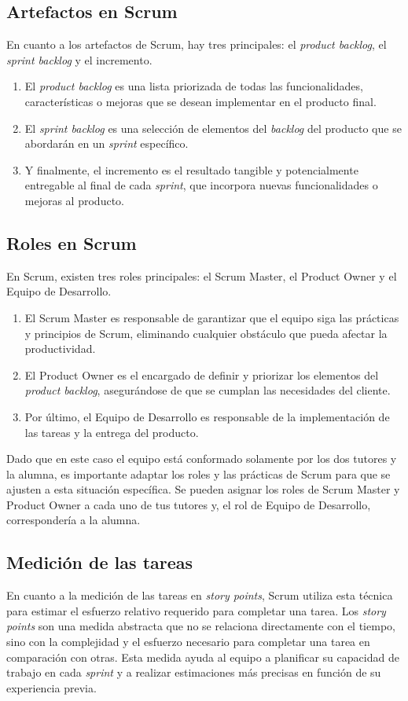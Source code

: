 \subsection{Artefactos en Scrum}
En cuanto a los artefactos de Scrum, hay tres principales: el \textit{product backlog}, el \textit{sprint backlog} y el incremento. 
\begin{enumerate}
    \item El \textit{product backlog} es una lista priorizada de todas las funcionalidades, características o mejoras que se desean implementar en el producto final. 
    \item El \textit{sprint backlog} es una selección de elementos del \textit{backlog} del producto que se abordarán en un \textit{sprint} específico. 
    \item Y finalmente, el incremento es el resultado tangible y potencialmente entregable al final de cada \textit{sprint}, que incorpora nuevas funcionalidades o mejoras al producto.
\end{enumerate}

\subsection{Roles en Scrum}
En Scrum, existen tres roles principales: el Scrum Master, el Product Owner y el Equipo de Desarrollo. 
\begin{enumerate}
    \item El Scrum Master es responsable de garantizar que el equipo siga las prácticas y principios de Scrum, eliminando cualquier obstáculo que pueda afectar la productividad. 
    \item El Product Owner es el encargado de definir y priorizar los elementos del \textit{product backlog}, asegurándose de que se cumplan las necesidades del cliente. 
    \item Por último, el Equipo de Desarrollo es responsable de la implementación de las tareas y la entrega del producto.
\end{enumerate}

Dado que en este caso el equipo está conformado solamente por los dos tutores y la alumna, es importante adaptar los roles y las prácticas de Scrum para que se ajusten a esta situación específica. Se pueden asignar los roles de Scrum Master y Product Owner a cada uno de tus tutores y, el rol de Equipo de Desarrollo, correspondería a la alumna. 

\subsection{Medición de las tareas}
En cuanto a la medición de las tareas en \textit{story points}, Scrum utiliza esta técnica para estimar el esfuerzo relativo requerido para completar una tarea. Los \textit{story points} son una medida abstracta que no se relaciona directamente con el tiempo, sino con la complejidad y el esfuerzo necesario para completar una tarea en comparación con otras. Esta medida ayuda al equipo a planificar su capacidad de trabajo en cada \textit{sprint} y a realizar estimaciones más precisas en función de su experiencia previa.


